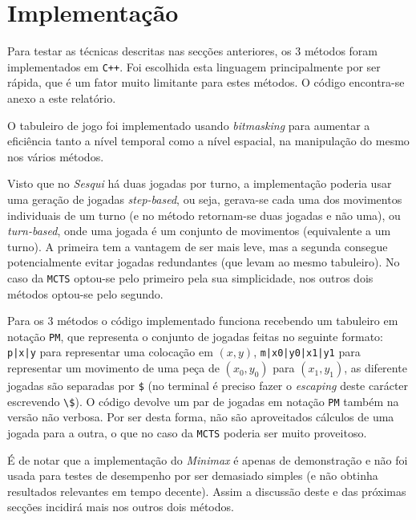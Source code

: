 \documentclass[12pt,a4paper,oneside]{article}
\begin{document}

\section{Implementação}
\label{sec:imp}

Para testar as técnicas descritas nas secções anteriores, os 3 métodos
foram implementados em \texttt{C++}. Foi escolhida esta linguagem
principalmente por ser rápida, que é um fator muito limitante para
estes métodos. O código encontra-se anexo a este relatório.

O tabuleiro de jogo foi implementado usando \textit{bitmasking} para
aumentar a eficiência tanto a nível temporal como a nível espacial, na
manipulação do mesmo nos vários métodos.

Visto que no \textit{Sesqui} há duas jogadas por turno, a
implementação poderia usar uma geração de jogadas \textit{step-based},
ou seja, gerava-se cada uma dos movimentos individuais de um turno (e
no método retornam-se duas jogadas e não uma), ou \textit{turn-based},
onde uma jogada é um conjunto de movimentos (equivalente a um
turno). A primeira tem a vantagem de ser mais leve, mas a segunda
consegue potencialmente evitar jogadas redundantes (que levam ao mesmo
tabuleiro). No caso da \texttt{MCTS} optou-se pelo primeiro pela sua
simplicidade, nos outros dois métodos optou-se pelo segundo.

Para os 3 métodos o código implementado funciona recebendo um
tabuleiro em notação \texttt{PM}, que representa o conjunto de jogadas
feitas no seguinte formato: \texttt{p|x|y} para representar uma
colocação em $(x, y)$, \texttt{m|x0|y0|x1|y1} para representar um
movimento de uma peça de $(x_0, y_0)$ para $(x_1, y_1)$, as diferente
jogadas são separadas por \texttt{\$} (no terminal é preciso fazer o
\textit{escaping} deste carácter escrevendo
\texttt{\textbackslash\$}). O código devolve um par de jogadas em
notação \texttt{PM} também na versão não verbosa. Por ser desta forma,
não são aproveitados cálculos de uma jogada para a outra, o que no
caso da \texttt{MCTS} poderia ser muito proveitoso.

É de notar que a implementação do \textit{Minimax} é apenas de
demonstração e não foi usada para testes de desempenho por ser
demasiado simples (e não obtinha resultados relevantes em tempo
decente). Assim a discussão deste e das próximas secções incidirá mais
nos outros dois métodos.
\end{document}
